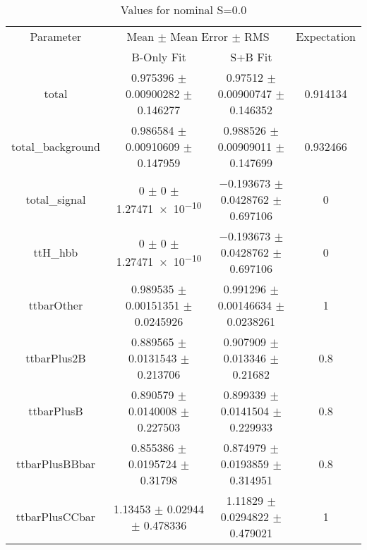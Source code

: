\begin{table}
\centering
\caption{Values for nominal S=0.0}
\begin{tabular}{cccc}
\toprule
Parameter & \multicolumn{2}{c}{Mean $\pm$ Mean Error $\pm$ RMS} & Expectation\\
 & B-Only Fit & S+B Fit & \\
\midrule
total & \num{0.975396} $\pm$ \num{0.00900282} $\pm$ \num{0.146277} & \num{0.97512} $\pm$ \num{0.00900747} $\pm$ \num{0.146352} & \num{0.914134}\\
total\_background & \num{0.986584} $\pm$ \num{0.00910609} $\pm$ \num{0.147959} & \num{0.988526} $\pm$ \num{0.00909011} $\pm$ \num{0.147699} & \num{0.932466}\\
total\_signal & \num{0} $\pm$ \num{0} $\pm$ \num{1.27471e-10} & \num{-0.193673} $\pm$ \num{0.0428762} $\pm$ \num{0.697106} & \num{0}\\
ttH\_hbb & \num{0} $\pm$ \num{0} $\pm$ \num{1.27471e-10} & \num{-0.193673} $\pm$ \num{0.0428762} $\pm$ \num{0.697106} & \num{0}\\
ttbarOther & \num{0.989535} $\pm$ \num{0.00151351} $\pm$ \num{0.0245926} & \num{0.991296} $\pm$ \num{0.00146634} $\pm$ \num{0.0238261} & \num{1}\\
ttbarPlus2B & \num{0.889565} $\pm$ \num{0.0131543} $\pm$ \num{0.213706} & \num{0.907909} $\pm$ \num{0.013346} $\pm$ \num{0.21682} & \num{0.8}\\
ttbarPlusB & \num{0.890579} $\pm$ \num{0.0140008} $\pm$ \num{0.227503} & \num{0.899339} $\pm$ \num{0.0141504} $\pm$ \num{0.229933} & \num{0.8}\\
ttbarPlusBBbar & \num{0.855386} $\pm$ \num{0.0195724} $\pm$ \num{0.31798} & \num{0.874979} $\pm$ \num{0.0193859} $\pm$ \num{0.314951} & \num{0.8}\\
ttbarPlusCCbar & \num{1.13453} $\pm$ \num{0.02944} $\pm$ \num{0.478336} & \num{1.11829} $\pm$ \num{0.0294822} $\pm$ \num{0.479021} & \num{1}\\
\bottomrule
\end{tabular}
\end{table}